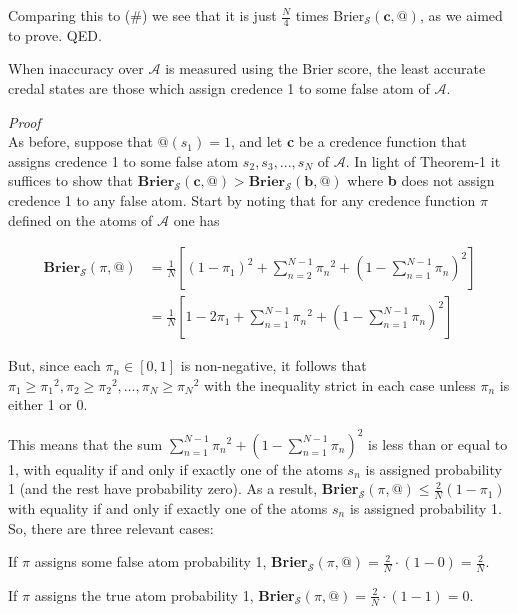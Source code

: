 \documentclass[
  10pt,
  letterpaper,
  DIV=11,
  numbers=noendperiod,
  twoside]{scrartcl}
\providecommand{\tightlist}{%
  \setlength{\itemsep}{0pt}\setlength{\parskip}{0pt}}\usepackage{longtable,booktabs,array}
\begin{document}
Comparing this to (\#) we see that it is just \(\frac{N}{4}\) times
Brier\(_\mathscr{S}(\mathbf{c},@)\), as we aimed to prove. QED.

\begin{description}
\tightlist
\item[Theorem-2]
When inaccuracy over \(\mathscr{A}\) is measured using the Brier score,
the least accurate credal states are those which assign credence 1 to
some false atom of \(\mathscr{A}\).
\end{description}

\emph{Proof}\\
As before, suppose that \(@(s_1) = 1\), and let \textbf{c} be a credence
function that assigns credence 1 to some false atom
\(s_2, s_3,..., s_N\) of \(\mathscr{A}\). In light of Theorem-1 it
suffices to show that
\(\mathbf{Brier}_\mathscr{S}(\mathbf{c}, @) > \mathbf{Brier}_\mathscr{S}(\mathbf{b}, @)\)
where \textbf{b} does not assign credence 1 to any false atom. Start by
noting that for any credence function \(\pi\) defined on the atoms of
\(\mathscr{A}\) one has

\[
\begin{aligned}
\mathbf{Brier}_\mathscr{S}(\pi,@) &= \frac{1}{N}[(1-\pi_1)^2 + \sum_{n=2}^{N-1}\pi{_n}^2+ (1-\sum_{n=1}^{N-1}\pi{_n})^2] \\
&= \frac{1}{N}[1 - 2\pi_1 + \sum_{n=1}^{N-1}\pi{_n}^2+ (1-\sum_{n=1}^{N-1}\pi{_n})^2]
\end{aligned}
\]

But, since each \(\pi_n \in [0, 1]\) is non-negative, it follows that
\(\pi_1 \geq \pi{_1}^2, \pi_2 \geq \pi{_2}^2, \dots, \pi_N \geq \pi{_N}^2\)
with the inequality strict in each case unless \(\pi_n\) is either 1 or
0.

This means that the sum
\(\sum_{n=1}^{N-1}\pi{_n}^2+ (1-\sum_{n=1}^{N-1}\pi{_n})^2\) is less
than or equal to 1, with equality if and only if exactly one of the
atoms \(s_n\) is assigned probability 1 (and the rest have probability
zero). As a result,
\textbf{Brier}\(_\mathscr{S}(\pi, @) \leq \frac{2}{N}(1 - \pi_1)\) with
equality if and only if exactly one of the atoms \(s_n\) is assigned
probability 1. So, there are three relevant cases:

If \(\pi\) assigns some false atom probability 1,
\textbf{Brier}\(_\mathscr{S}(\pi, @) = \frac{2}{N}\cdot(1 - 0) = \frac{2}{N}\).

If \(\pi\) assigns the true atom probability 1,
\textbf{Brier}\(_\mathscr{S}(\pi, @) = \frac{2}{N}\cdot(1 - 1) = 0\).
\end{document}
